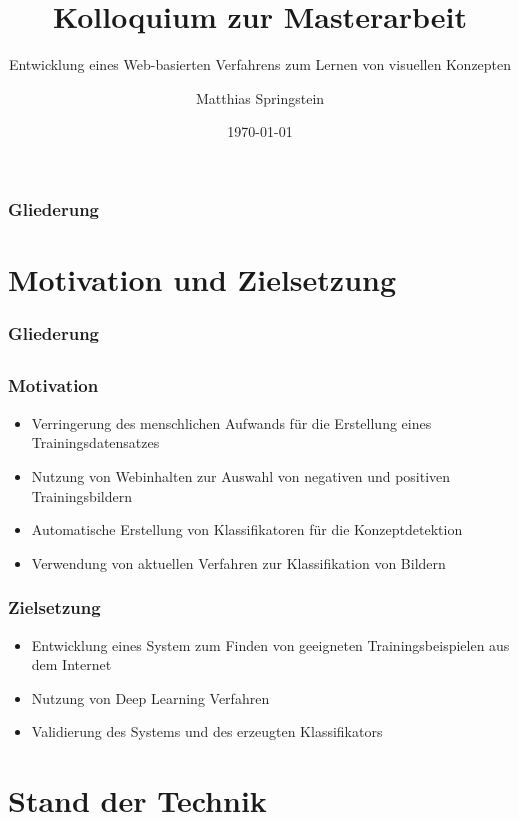 \documentclass[utf8]{beamer}
\title{Kolloquium zur Masterarbeit}
\subtitle{Entwicklung eines Web-basierten Verfahrens zum Lernen von visuellen Konzepten}
\author[M. Springstein]{Matthias Springstein}
\date{\today}
\begin{document}
\maketitle

\begin{frame}
    \frametitle{Gliederung}
    \tableofcontents
\end{frame}

\section{Motivation und Zielsetzung}
\begin{frame}
    \frametitle{Gliederung}
    \tableofcontents[currentsection]
\end{frame}

\subsection{}
\begin{frame}
    \frametitle{Motivation}
    \begin{itemize}
        \item Verringerung des menschlichen Aufwands für die Erstellung eines Trainingsdatensatzes
        \item Nutzung von Webinhalten zur Auswahl von negativen und positiven Trainingsbildern
        \item Automatische Erstellung von Klassifikatoren für die Konzeptdetektion
        \item Verwendung von aktuellen Verfahren zur Klassifikation von Bildern
    \end{itemize}
\end{frame}

\begin{frame}
    \frametitle{Zielsetzung}
    \begin{itemize}
        \item Entwicklung eines System zum Finden von geeigneten Trainingsbeispielen aus dem Internet
        \item Nutzung von Deep Learning Verfahren
        \item Validierung des Systems und des erzeugten Klassifikators
    \end{itemize}
\end{frame}

\section{Stand der Technik}
\end{document}
